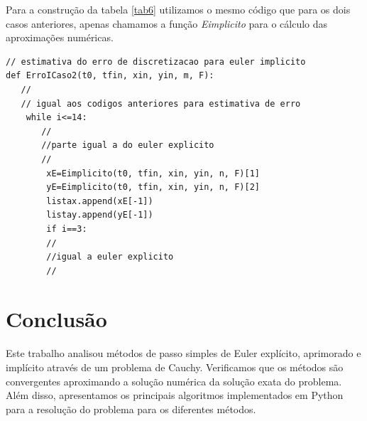 \documentclass[amsmath,amssymb,floatfix]{revtex4}
\begin{document}
Para a construção da tabela \ref{tab6} utilizamos o mesmo código que para os dois casos anteriores, apenas chamamos a função \textit{Eimplicito} para o cálculo das aproximações numéricas. 

\begin{lstlisting}
// estimativa do erro de discretizacao para euler implicito
def ErroICaso2(t0, tfin, xin, yin, m, F):
   //
   // igual aos codigos anteriores para estimativa de erro     
    while i<=14:
       //
       //parte igual a do euler explicito
       //
        xE=Eimplicito(t0, tfin, xin, yin, n, F)[1]
        yE=Eimplicito(t0, tfin, xin, yin, n, F)[2]
        listax.append(xE[-1])
        listay.append(yE[-1])
        if i==3:
        //
        //igual a euler explicito 
     	//
\end{lstlisting}

\section{Conclusão}

Este trabalho analisou métodos de passo simples de Euler explícito, aprimorado e implícito através de um problema de Cauchy. Verificamos que os métodos são convergentes aproximando a solução numérica da solução exata do problema. Além disso, apresentamos os principais algoritmos implementados em Python para a resolução do problema para os diferentes métodos.   



\end{document}
